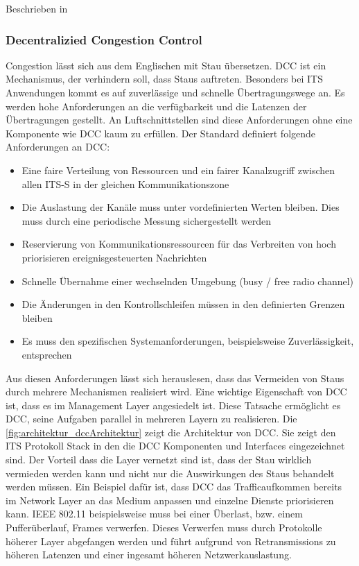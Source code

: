 Beschrieben in \cite{etsi102723-2}

\subsubsection{Decentralizied Congestion Control\label{architektur_dcc}}
Congestion lässt sich aus dem Englischen mit Stau übersetzen. \ac{DCC} ist ein Mechanismus, der verhindern soll, dass Staus auftreten. Besonders bei \ac{ITS} Anwendungen kommt es auf zuverlässige und schnelle Übertragungswege an. Es werden hohe Anforderungen an die ver\-füg\-barkeit und die Latenzen der Übertragungen gestellt. An Luftschnittstellen sind diese Anforderungen ohne eine Komponente wie \ac{DCC} kaum zu erfüllen. Der Standard \cite{etsi102687} definiert folgende Anforderungen an \ac{DCC}:
\begin{itemize}
	\item Eine faire Verteilung von Ressourcen und ein fairer Kanalzugriff zwischen allen \ac{ITS-S} in der gleichen Kommunikationszone
	\item Die Auslastung der Kanäle muss unter vordefinierten Werten bleiben. Dies muss durch eine periodische Messung sichergestellt werden
	\item Reservierung von Kommunikationsressourcen für das Verbreiten von hoch priorisieren ereignisgesteuerten Nachrichten
	\item Schnelle Übernahme einer wechselnden Umgebung (busy / free radio channel)
	\item Die Änderungen in den Kontrollschleifen müssen in den definierten Grenzen bleiben
	\item Es muss den spezifischen Systemanforderungen, beispielsweise Zuverlässigkeit, entsprechen
\end{itemize}

Aus diesen Anforderungen lässt sich herauslesen, dass das Vermeiden von Staus durch mehrere Mechanismen realisiert wird. Eine wichtige Eigenschaft von \ac{DCC} ist, dass es im Management Layer angesiedelt ist. Diese Tatsache ermöglicht es \ac{DCC}, seine Aufgaben parallel in mehreren Layern zu realisieren. Die \autoref{fig:architektur_dccArchitektur} zeigt die Architektur von \ac{DCC}. Sie zeigt den \ac{ITS} Protokoll Stack in den die \ac{DCC} Komponenten und Interfaces eingezeichnet sind. Der Vorteil dass die Layer vernetzt sind ist, dass der Stau wirklich vermieden werden kann und nicht nur die Auswirkungen des Staus behandelt werden müssen. Ein Beispiel dafür ist, dass \ac{DCC} das Trafficaufkommen bereits im Network Layer an das Medium anpassen und einzelne Dienste priorisieren kann. IEEE 802.11 beispielsweise muss bei einer Überlast, bzw. einem Pufferüberlauf, Frames verwerfen. Dieses Verwerfen muss durch Protokolle höherer Layer abgefangen werden und führt aufgrund von Retransmissions zu höheren Latenzen und einer ingesamt höheren Netzwerkauslastung. 

